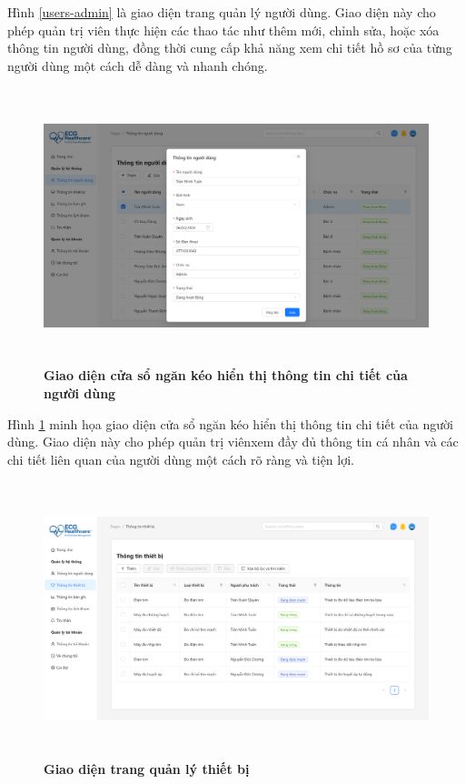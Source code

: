 Hình \ref{users-admin} là giao diện trang quản lý người dùng. Giao diện này cho phép quản trị viên thực hiện các thao tác như thêm mới,
chỉnh sửa, hoặc xóa thông tin người dùng, đồng thời cung cấp khả năng xem chi tiết hồ sơ của từng người dùng một cách dễ dàng và nhanh chóng.

\begin{figure}[H]
	\centering
	\includegraphics[width=15cm,height=8cm]{Images/admin_ui/user-detail.png}
	\caption[Giao diện cửa sổ ngăn kéo hiển thị thông tin chi tiết của người dùng]{\bfseries \fontsize{12pt}{0pt}\selectfont Giao diện cửa sổ ngăn kéo hiển thị thông tin chi tiết của người dùng}
	\label{user-detail-admin}
\end{figure}

Hình \ref{user-detail-admin} minh họa giao diện cửa sổ ngăn kéo hiển thị thông tin chi tiết của người dùng. Giao diện này
cho phép quản trị viênxem đầy đủ thông tin cá nhân và các chi tiết liên quan của người dùng một cách rõ ràng và tiện lợi.

\begin{figure}[H]
	\centering
	\includegraphics[width=15cm,height=8cm]{Images/admin_ui/devices.png}
	\caption[Giao diện trang quản lý thiết bị]{\bfseries \fontsize{12pt}{0pt}\selectfont Giao diện trang quản lý thiết bị}
	\label{devices-admin}
\end{figure}

